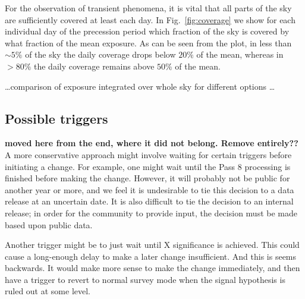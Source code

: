 \documentclass[aps,prd,superscriptaddress,showpacs,nofootinbib,fixlfloat, 12pt]{revtex4-1}
\begin{document}
For the observation of transient phenomena, it is vital that all parts of the
sky are sufficiently covered at least each day. In Fig.~\ref{fig:coverage} we
show for each individual day of the precession period which fraction of the
sky is covered by what fraction of the mean exposure. As can be seen from the
plot, in less than $\sim5\%$ of the sky the daily coverage drops below $20\%$
of the mean, whereas in $>80\%$ the daily coverage remains above $50\%$ of the
mean.

\dots comparison of exposure integrated over whole sky for different options \dots

\subsection{Possible triggers}
{\bf moved here from the end, where it did not belong.  Remove entirely??}
A more conservative approach might involve waiting for certain triggers before
initiating a change.  For example, one might wait until the Pass 8 processing
is finished before making the change.  However, it will probably not be public
for another year or more, and we feel it is undesirable to tie this decision
to a data release at an uncertain date.  It is also difficult to tie the
decision to an internal release; in order for the community to provide input,
the decision must be made based upon public data. 

Another trigger might be to just wait until X significance is achieved.  This
could cause a long-enough delay to make a later change insufficient.  And this
is seems backwards.  It would make more sense to make the change immediately,
and then have a trigger to revert to normal survey mode when the signal
hypothesis is ruled out at some level.
\end{document}
